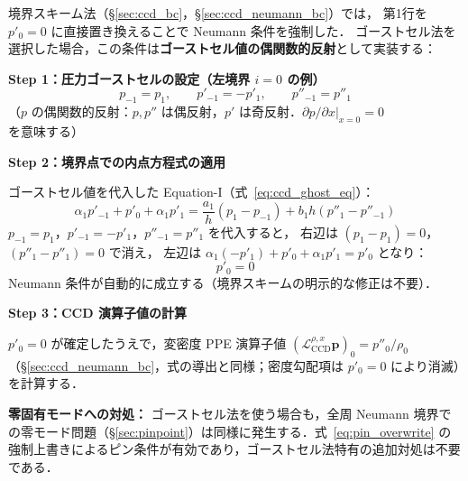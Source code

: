 \begin{tcolorbox}[algbox, title={PPE Neumann 境界条件のゴーストセル法による再設計（$\partial p/\partial n = 0$ の場合）}]
境界スキーム法（§\ref{sec:ccd_bc}，§\ref{sec:ccd_neumann_bc}）では，
第1行を $p'_0 = 0$ に直接置き換えることで Neumann 条件を強制した．
ゴーストセル法を選択した場合，この条件は\textbf{ゴーストセル値の偶関数的反射}として実装する：

\medskip
\textbf{Step 1：圧力ゴーストセルの設定（左境界 $i=0$ の例）}
\[
  p_{-1} = p_1, \qquad p'_{-1} = -p'_1, \qquad p''_{-1} = p''_1
\]
（$p$ の偶関数的反射：$p, p''$ は偶反射，$p'$ は奇反射．$\partial p/\partial x|_{x=0} = 0$ を意味する）

\textbf{Step 2：境界点での内点方程式の適用}

ゴーストセル値を代入した Equation-I（式~\eqref{eq:ccd_ghost_eq}）：
\[
  \alpha_1 p'_{-1} + p'_0 + \alpha_1 p'_1
  = \frac{a_1}{h}(p_1 - p_{-1}) + b_1 h(p''_1 - p''_{-1})
\]
$p_{-1} = p_1$，$p'_{-1} = -p'_1$，$p''_{-1} = p''_1$ を代入すると，
右辺は $(p_1 - p_1) = 0$，$(p''_1 - p''_1) = 0$ で消え，
左辺は $\alpha_1(-p'_1) + p'_0 + \alpha_1 p'_1 = p'_0$ となり：
\[
  p'_0 = 0
\]
Neumann 条件が自動的に成立する（境界スキームの明示的な修正は不要）．

\textbf{Step 3：CCD 演算子値の計算}

$p'_0 = 0$ が確定したうえで，変密度 PPE 演算子値
$(\mathcal{L}_{\mathrm{CCD}}^{\rho,x}\bm{p})_0 = p''_0/\rho_0$
（§\ref{sec:ccd_neumann_bc}，式の導出と同様；密度勾配項は $p'_0=0$ により消滅）を計算する．

\medskip
\textbf{零固有モードへの対処：} ゴーストセル法を使う場合も，全周 Neumann 境界での零モード問題（§\ref{sec:pinpoint}）は同様に発生する．式~\eqref{eq:pin_overwrite} の強制上書きによるピン条件が有効であり，ゴーストセル法特有の追加対処は不要である．
\end{tcolorbox}

